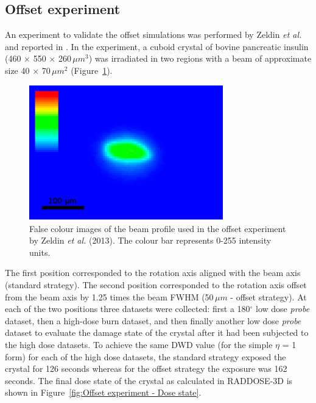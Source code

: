 \subsection{Offset experiment}
\label{sub:Offset Experiment}
An experiment to validate the offset simulations was performed by Zeldin \textit{et al.} and reported in \cite{zeldin2013dwd}.
In the experiment, a cuboid crystal of bovine pancreatic insulin (460 $\times$ 550 $\times$ 260$\,\mu m^3$) was irradiated in two regions with a beam of approximate size 40 $\times$ 70$\,\mu m^2$ (Figure~\ref{fig:Offset experiment - Beam}).
\begin{figure}
  \centering
    \includegraphics[width=0.75\textwidth]{figures/dwd/Oli_offset_exp_beam.png}
    \caption[Beam profile used in the offset experiment described in Zeldin \textit{et al.} (2013).]{False colour images of the beam profile used in the offset experiment by Zeldin \textit{et al.} (2013). The colour bar represents 0-255 intensity units.}
    \label{fig:Offset experiment - Beam}
\end{figure}
The first position corresponded to the rotation axis aligned with the beam axis (standard strategy).
The second position corresponded to the rotation axis offset from the beam axis by 1.25 times the beam FWHM (50$\,\mu m$ - offset strategy).
At each of the two positions three datasets were collected: first a 180$^{\circ}$ low dose \textit{probe} dataset, then a high-dose burn dataset, and then finally another low dose \textit{probe} dataset to evaluate the damage state of the crystal after it had been subjected to the high dose datasets.
To achieve the same DWD value (for the simple $\eta$ = 1 form) for each of the high dose datasets, the standard strategy exposed the crystal for 126 seconds whereas for the offset strategy the exposure was 162 seconds.
The final dose state of the crystal as calculated in RADDOSE-3D is shown in Figure~\ref{fig:Offset experiment - Dose state}.
